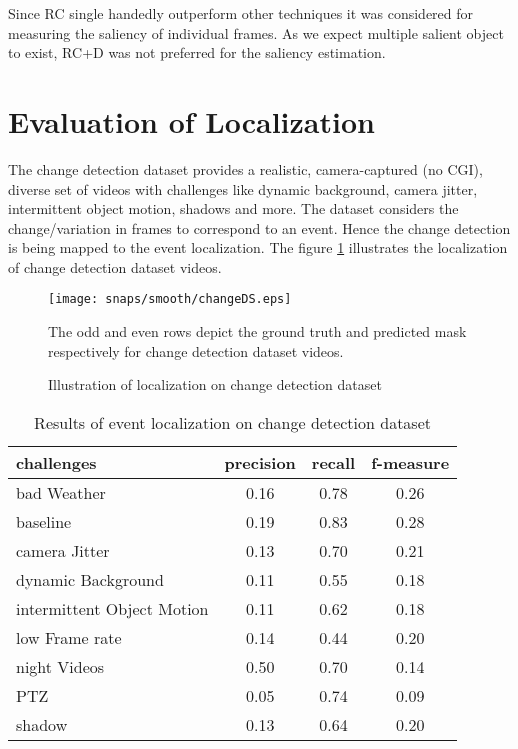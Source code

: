 \par Since RC single handedly outperform other techniques it was considered for measuring the saliency of individual frames.  As we expect multiple salient object to exist, RC+D was not preferred for the saliency estimation.
 
\section{Evaluation of Localization}
\label{sec:EvLoc}
The change detection dataset \citep{cdnet} provides  a realistic, camera-captured (no CGI), diverse set of videos with challenges like dynamic background, camera jitter, intermittent object motion, shadows and more.  The dataset considers the change/variation in frames to correspond to an event. Hence the change detection is being mapped to the event localization.  The figure \ref{fig:changeDb} illustrates the localization of change detection dataset videos.
\begin{figure}[htpb]
   \begin{center}
	    \texttt{[image: snaps/smooth/changeDS.eps]}     
     \caption {Illustration of localization on change detection dataset}
   \label{fig:changeDb}
    \medskip \small The odd and even rows depict the ground truth and predicted mask respectively for change detection dataset videos. 
   \end{center}
 \end{figure}
\begin{table}[htbp]
   \caption{Results of event localization on change detection dataset}
   \begin{center}
   \begin{tabular}{|l|c|c|c|} \hline
        \textbf{challenges} & \textbf{precision} & \textbf{recall} & \textbf{f-measure} \\ \hline
		bad Weather & 0.16 & 0.78 & 0.26\\
		baseline & 0.19 & 0.83 & 0.28\\
		camera Jitter & 0.13 & 0.70 & 0.21 \\
		dynamic Background & 0.11 & 0.55 &  0.18\\
		intermittent Object Motion & 0.11 & 0.62 & 0.18 \\
		low Frame rate & 0.14 & 0.44 & 0.20 \\
		night Videos & 0.50 & 0.70 & 0.14 \\
		PTZ & 0.05 & 0.74 & 0.09\\
		shadow & 0.13 & 0.64 & 0.20\\ \hline
   \end{tabular}
   \label{tab:evalLoc}
   \end{center}
 \end{table} 
